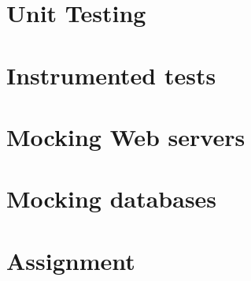 \graphicspath{{./lab06/Images/}}


\maketocpage

\section{Unit Testing}
\section{Instrumented tests}
\section{Mocking Web servers}
\section{Mocking databases}
\section{Assignment}
